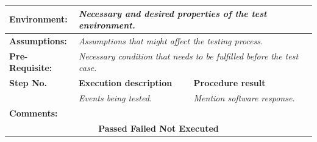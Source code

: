 \begin{table}[!ht]
\begin{tabular}{|llll|}
\multicolumn{1}{|l|}{\textbf{Environment:}} &
  \multicolumn{3}{l|}{\textit{Necessary and desired properties of the test environment.}} \\ \hline
\multicolumn{1}{|l|}{\textbf{Assumptions:}} &
  \multicolumn{3}{l|}{\textit{Assumptions that might affect the testing process.}} \\ \hline
\multicolumn{1}{|l|}{\textbf{Pre-Requisite:}} &
  \multicolumn{3}{l|}{\textit{Necessary condition that  needs to be fulfilled before the test case.}} \\ \hline
\multicolumn{1}{|l|}{\textbf{Step No.}} &
  \multicolumn{1}{l|}{\textbf{Execution   description}} &
  \multicolumn{2}{l|}{\textbf{Procedure result}} \\ \hline
\multicolumn{1}{|l|}{} &
  \multicolumn{1}{l|}{\textit{Events being tested.}} &
  \multicolumn{2}{l|}{\textit{Mention software response.}} \\ \hline
\multicolumn{4}{|l|}{\textbf{Comments:}} \\ \hline
\multicolumn{4}{|c|}{\textbf{Passed      Failed     Not Executed}} \\ \hline
\end{tabular}
\label{tab:3}
\end{table}
